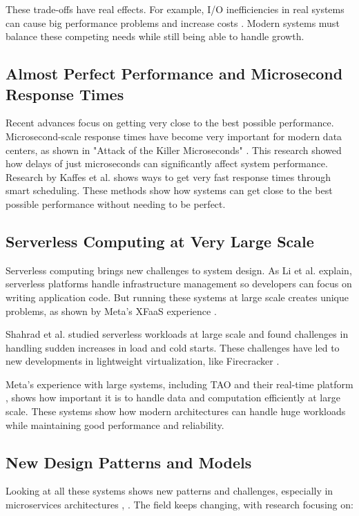 \documentclass[12pt]{article}
\begin{document}
These trade-offs have real effects. For example, I/O inefficiencies in real systems can cause big performance problems and increase costs \cite{atikoglu2012workload}. Modern systems must balance these competing needs while still being able to handle growth.

\subsection{Almost Perfect Performance and Microsecond Response Times}
Recent advances focus on getting very close to the best possible performance. Microsecond-scale response times have become very important for modern data centers, as shown in "Attack of the Killer Microseconds" \cite{barroso2017attack}. This research showed how delays of just microseconds can significantly affect system performance.
Research by Kaffes et al. \cite{kaffes2019shinjuku} shows ways to get very fast response times through smart scheduling. These methods show how systems can get close to the best possible performance without needing to be perfect.

\subsection{Serverless Computing at Very Large Scale}
Serverless computing brings new challenges to system design. As Li et al. \cite{li2022serverless} explain, serverless platforms handle infrastructure management so developers can focus on writing application code. But running these systems at large scale creates unique problems, as shown by Meta's XFaaS experience \cite{shahrad2020serverless}.

Shahrad et al. \cite{shahrad2020serverless} studied serverless workloads at large scale and found challenges in handling sudden increases in load and cold starts. These challenges have led to new developments in lightweight virtualization, like Firecracker \cite{agache2020firecracker}.

Meta's experience with large systems, including TAO \cite{bronson2013tao} and their real-time platform \cite{chen2016realtime}, shows how important it is to handle data and computation efficiently at large scale. These systems show how modern architectures can handle huge workloads while maintaining good performance and reliability.

\subsection{New Design Patterns and Models}
Looking at all these systems shows new patterns and challenges, especially in microservices architectures \cite{gan2019open}, \cite{netflix_microservices}. The field keeps changing, with research focusing on:
\end{document}
